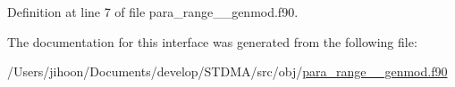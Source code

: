 Definition at line 7 of file para\+\_\+range\+\_\+\+\_\+genmod.\+f90.



The documentation for this interface was generated from the following file\+:\begin{DoxyCompactItemize}
\item 
/\+Users/jihoon/\+Documents/develop/\+S\+T\+D\+M\+A/src/obj/\mbox{\hyperlink{para__range____genmod_8f90}{para\+\_\+range\+\_\+\+\_\+genmod.\+f90}}\end{DoxyCompactItemize}
